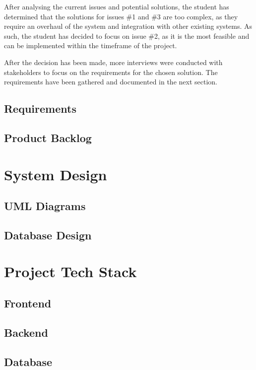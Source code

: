 After analysing the current issues and potential solutions, the student has determined that the solutions for issues \#1 and \#3 are too complex, as they require an overhaul of the system and integration with other existing systems. As such, the student has decided to focus on issue \#2, as it is the most feasible and can be implemented within the timeframe of the project. 

After the decision has been made, more interviews were conducted with stakeholders to focus on the requirements for the chosen solution. The requirements have been gathered and documented in the next section.

\subsection{Requirements}

\subsection{Product Backlog}

\section{System Design}

\subsection{UML Diagrams}

\subsection{Database Design}

\section{Project Tech Stack}

\subsection{Frontend}

\subsection{Backend}

\subsection{Database}